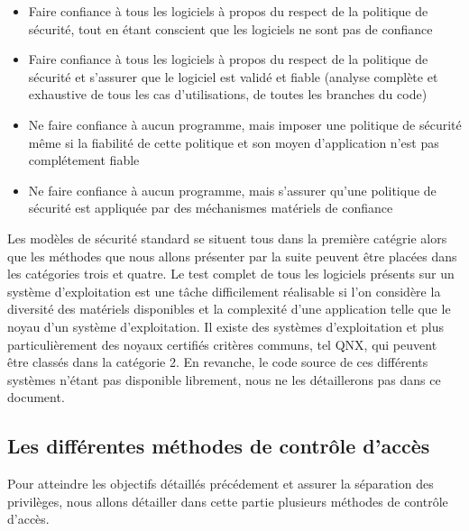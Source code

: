 \begin{itemize}
  \item Faire confiance à tous les logiciels à propos du respect de la politique de sécurité, tout en étant conscient que les logiciels ne sont pas de confiance %
  \item Faire confiance à tous les logiciels à propos du respect de la politique de sécurité et s'assurer que le logiciel est validé et fiable (analyse complète et exhaustive de tous les cas d'utilisations, de toutes les branches du code) %
  \item Ne faire confiance à aucun programme, mais imposer une politique de sécurité même si la fiabilité de cette politique et son moyen d'application n'est pas complétement fiable%
  \item Ne faire confiance à aucun programme, mais s'assurer qu'une politique de sécurité est appliquée par des méchanismes matériels de confiance%
\end{itemize}

Les modèles de sécurité standard se situent tous dans la première catégrie alors que les méthodes que nous allons présenter par la suite peuvent être placées dans les catégories trois et quatre. Le test complet de tous les logiciels présents sur un système d'exploitation est une tâche difficilement réalisable si l'on considère la diversité des matériels disponibles et la complexité d'une application telle que le noyau d'un système d'exploitation. Il existe des systèmes d'exploitation et plus particulièrement des noyaux certifiés critères communs, tel QNX\cite{QNX}, qui peuvent être classés dans la catégorie 2. En revanche, le code source de ces différents systèmes n'étant pas disponible librement, nous ne les détaillerons pas dans ce document.

\subsection{Les différentes méthodes de contrôle d'accès}

Pour atteindre les objectifs détaillés précédement et assurer la séparation des privilèges, nous allons détailler dans cette partie plusieurs méthodes de contrôle d'accès.

